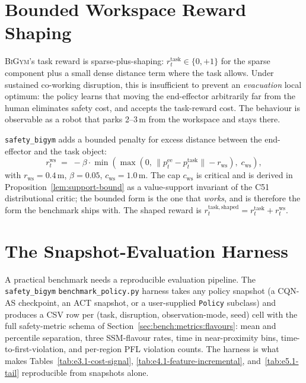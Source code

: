 \documentclass[11pt,a4paper]{report}
\newcommand{\pfl}{PFL}
\newcommand{\bigym}{\textsc{BiGym}}
\newcommand{\sbigym}{\texttt{safety\_bigym}}
\newcommand{\cqnas}{CQN-AS}
\begin{document}
\section{Bounded Workspace Reward Shaping}
\label{sec:bench:workspace}

\bigym{}'s task reward is sparse-plus-shaping: $r^{\mathrm{task}}_t
\in \{0, +1\}$ for the sparse component plus a small dense distance
term where the task allows. Under sustained co-working disruption,
this is insufficient to prevent an \emph{evacuation} local optimum:
the policy learns that moving the end-effector arbitrarily far from
the human eliminates safety cost, and accepts the task-reward cost.
The behaviour is observable as a robot that parks 2--3\,m from the
workspace and stays there.

\sbigym{} adds a bounded penalty for excess distance between the
end-effector and the task object:
\begin{equation}
  r^{\mathrm{ws}}_t \;=\; -\beta \cdot
    \min\!\left(
      \max(0,\, \|p^{\mathrm{ee}}_t - p^{\mathrm{task}}_t\| - r_{\mathrm{ws}})
      ,\; c_{\mathrm{ws}}
    \right),
  \label{eq:r-workspace}
\end{equation}
with $r_{\mathrm{ws}} = 0.4$\,m, $\beta = 0.05$, $c_{\mathrm{ws}} =
1.0$\,m. The cap $c_{\mathrm{ws}}$ is critical and is derived in
Proposition~\ref{lem:support-bound} as a value-support invariant of the
C51 distributional critic; the bounded form is the one that
\emph{works}, and is therefore the form the benchmark ships with.
The shaped reward is $r^{\mathrm{task,shaped}}_t = r^{\mathrm{task}}_t
+ r^{\mathrm{ws}}_t$.

\section{The Snapshot-Evaluation Harness}
\label{sec:bench:harness}

A practical benchmark needs a reproducible evaluation pipeline. The
\sbigym{} \texttt{benchmark\_policy.py} harness takes any policy
snapshot (a \cqnas{} checkpoint, an ACT snapshot, or a user-supplied
\texttt{Policy} subclass) and produces a CSV row per (task,
disruption, observation-mode, seed) cell with the full safety-metric
schema of Section~\ref{sec:bench:metrics:flavours}: mean and
percentile separation, three SSM-flavour rates, time in
near-proximity bins, time-to-first-violation, and per-region
\pfl{} violation counts. The harness is what makes Tables~\ref{tab:e3.1-cost-signal},
\ref{tab:e4.1-feature-incremental}, and~\ref{tab:e5.1-tail}
reproducible from snapshots alone.
\end{document}
